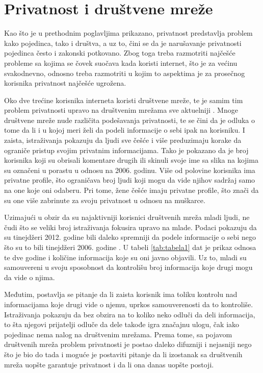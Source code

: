 \documentclass[a4paper]{article}
\begin{document}
\section{Privatnost i društvene mreže}
\label{sec:trecePoglavlje}
Kao što je u prethodnim poglavljima prikazano, privatnost predstavlja problem kako pojedinca, tako i društva, a uz to, čini se da je narušavanje privatnosti pojedinca često i zakonski potkovano. Zbog toga treba razmotriti najčešće probleme sa kojima se čovek suočava kada koristi internet, što je za većinu svakodnevno, odnosno treba razmotriti u kojim to aspektima je za prosečnog korisnika privatnost najčešće ugrožena.
\par Oko dve trećine korisnika interneta koristi društvene mreže, te je samim tim problem privatnosti upravo na društvenim mrežama sve aktuelniji \cite{sm1}. Mnoge društvene mreže nude različita podešavanja privatnosti, te se čini da je odluka o tome da li i u kojoj meri želi da podeli informacije o sebi ipak na korisniku. I zaista, istraživanja pokazuju da ljudi sve češće i više preduzimaju korake da ograniče pristup svojim privatnim informacijama. Tako je pokazano da je broj korisnika koji su obrisali komentare drugih ili skinuli svoje ime sa slika na kojima su označeni u porastu u odnosu na 2006. godinu. Više od polovine korisnika ima privatne profile, što ograničava broj ljudi koji mogu da vide njihov sadržaj samo na one koje oni odaberu. Pri tome, žene češće imaju privatne profile, što znači da su one više zabrinute za svoju privatnost u odnosu na muškarce.
\par Uzimajući u obzir da su najaktivniji korisnici društvenih mreža mladi ljudi, ne čudi što se veliki broj istraživanja fokusira upravo na mlade. Podaci pokazuju da su tinejdžeri 2012. godine bili daleko spremniji da podele informacije o sebi nego što su to bili tinejdžeri 2006. godine \cite{sm2}. U tabeli \ref{tab:tabela1} dat je prikaz odnosa te dve godine i količine informacija koje su oni javno objavili. Uz to, mladi su samouvereni u svoju sposobnost da kontrolišu broj informacija koje drugi mogu da vide o njima.
\par Međutim, postavlja se pitanje da li zaista korisnik ima toliku kontrolu nad informacijama koje drugi vide o njemu, uprkos samouverenosti da to kontroliše. Istraživanja pokazuju da bez obzira na to koliko neko odluči da deli informacija, to šta njegovi prijatelji odluče da dele takođe igra značajnu ulogu, čak iako pojedinac nema nalog na društvenim mrežama. Prema tome, sa pojavom društvenih mreža problem privatnosti je postao daleko difuzniji i nejasniji nego što je bio do tada i moguće je postaviti pitanje da li izostanak sa društvenih mreža uopšte garantuje privatnost i da li ona danas uopšte postoji.
\\
\end{document}
